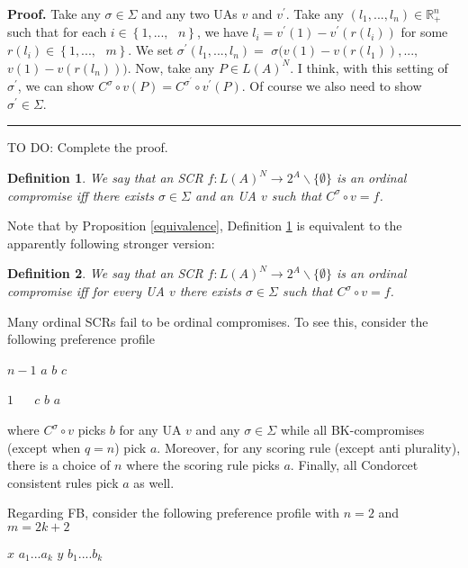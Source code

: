 \documentclass[12pt,notitlepage,a4paper]{article}
\newtheorem{definition}{Definition}[section]
\newenvironment{proof}[1][Proof]{\noindent\textbf{#1.} }{\ \rule{0.5em}{0.5em}}
\begin{document}
\begin{proof}
Take any $\sigma \in \Sigma $ and any two UAs $v$ and $v^{\prime }$. Take
any $(l_{1},...,l_{n})\in 
\mathbb{R}
_{+}^{n}$ such that for each $i\in \left\{ 1,...,\text{ }n\right\} $, we
have $l_{i}=v^{\prime }(1)-v^{\prime }(r(l_{i}))$ for some $r(l_{i})\in
\left\{ 1,...,\text{ }m\right\} $. We set $\sigma ^{\prime
}(l_{1},...,l_{n})=$ $\sigma (v(1)-v(r(l_{1})),...,$ $v(1)-v(r(l_{n}))).$
Now, take any $P\in L(A)^{N}$. I think, with this setting of $\sigma
^{\prime }$, we can show $C^{\sigma }\circ v(P)=C^{\sigma ^{\prime }}\circ
v^{\prime }(P).$ Of course we also need to show $\sigma ^{\prime }\in \Sigma 
$.
\end{proof}

TO DO: Complete the proof.

\begin{definition}
\label{D1} \bigskip We say that an SCR $f:L(A)^{N}\rightarrow
2^{A}\backslash \{\emptyset \}$ is an ordinal compromise iff there exists $%
\sigma \in \Sigma $ and an UA $v$ such that $C^{\sigma }\circ v=f$.
\end{definition}

Note that by Proposition \ref{equivalence}, Definition \ref{D1} is
equivalent to the apparently following stronger version:

\begin{definition}
\label{D2} We say that an SCR $f:L(A)^{N}\rightarrow 2^{A}\backslash
\{\emptyset \}$ is an ordinal compromise iff for every UA $v$ there exists $%
\sigma \in \Sigma $ such that $C^{\sigma }\circ v=f$.
\end{definition}

Many ordinal SCRs fail to be ordinal compromises. To see this, consider the
following preference profile

$n-1$ $a$ $b$ $c$

$1$ $\ \ \ \ \ \ c$ $b$ $a$

where $C^{\sigma }\circ v$ picks $b$ for any UA $v$ and any $\sigma \in
\Sigma $ while all BK-compromises (except when $q=n$) pick $a$. Moreover,
for any scoring rule (except anti plurality), there is a choice of $n$ where
the scoring rule picks $a$. Finally, all Condorcet consistent rules pick $a$
as well.

Regarding FB, consider the following preference profile with $n=2$ and $%
m=2k+2$

\bigskip

$x$ $a_{1}...a_{k}$ $y$ $b_{1}....b_{k}$
\end{document}
